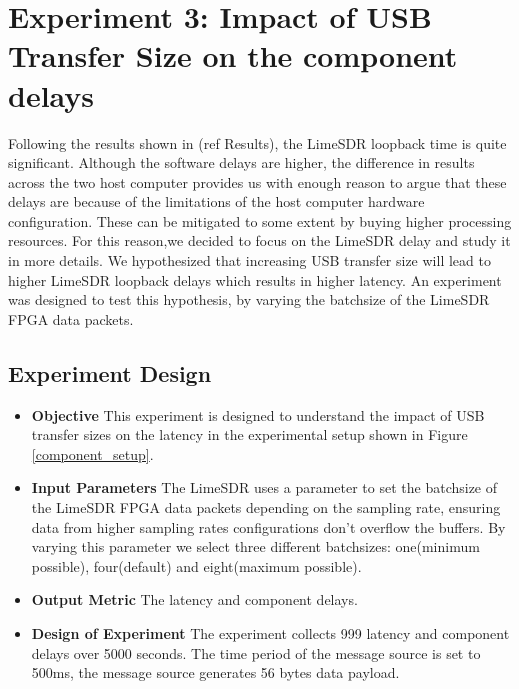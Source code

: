 \section{Experiment 3: Impact of USB Transfer Size on the component delays}

Following the results shown in (ref Results), the LimeSDR loopback time is quite significant.
Although the software delays are higher, the difference in results across the two host computer provides us with enough reason to argue that these delays are because of the limitations of the host computer hardware configuration.
These can be mitigated to some extent by buying higher processing resources.
For this reason,we decided to focus on the LimeSDR delay and study it in more details.
We hypothesized that increasing USB transfer size will lead to higher LimeSDR loopback delays which results in higher latency.
An experiment was designed to test this hypothesis, by varying the batchsize of the LimeSDR FPGA data packets.

\subsection{ Experiment Design}
\begin{itemize}
    \item \textbf{Objective} This experiment is designed to understand the impact of USB transfer sizes on the latency in the experimental setup shown in Figure \ref{component_setup}.
    \item \textbf{Input Parameters} The LimeSDR uses a parameter to set the batchsize of the LimeSDR FPGA data packets depending on the sampling rate, ensuring data from higher sampling rates configurations don't overflow the buffers.
    By varying this parameter we select three different batchsizes:
    one(minimum possible), four(default) and eight(maximum possible).
    \item \textbf{Output Metric} The latency and component delays.
    \item \textbf{Design of Experiment} The experiment collects 999 latency and component delays over 5000 seconds. The time period of the message source is set to 500ms, the message source generates 56 bytes data payload.
\end{itemize}




